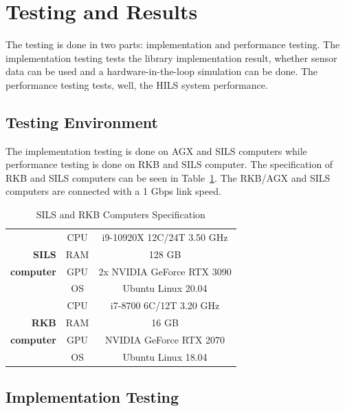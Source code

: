 \section{Testing and Results}

The testing is done in two parts: implementation and performance testing.  The
implementation testing tests the library implementation result, whether sensor
data can be used and a hardware-in-the-loop simulation can be done. The
performance testing tests, well, the HILS system performance.

\subsection{Testing Environment}

The implementation testing is done on AGX and SILS computers while performance
testing is done on RKB and SILS computer. The specification of RKB and SILS
computers can be seen in Table~\ref{tbl-section-6-computers-specs}. The RKB/AGX
and SILS computers are connected with a 1 Gbps link speed.

\begin{table}[htbp]
	\caption{SILS and RKB Computers Specification}
	\label{tbl-section-6-computers-specs}
	\begin{center}
		\begin{tabular}{r c c}
			\toprule
			                  & CPU & i9-10920X 12C/24T 3.50 GHz \\
			\textbf{SILS}     & RAM & 128 GB                     \\
			\textbf{computer} & GPU & 2x NVIDIA GeForce RTX 3090 \\
			                  & OS  & Ubuntu Linux 20.04         \\
			\midrule
			                  & CPU & i7-8700 6C/12T 3.20 GHz    \\
			\textbf{RKB}      & RAM & 16 GB                      \\
			\textbf{computer} & GPU & NVIDIA GeForce RTX 2070    \\
			                  & OS  & Ubuntu Linux 18.04         \\
			\bottomrule
		\end{tabular}
	\end{center}
\end{table}

\subsection{Implementation Testing}\label{section-4-implementation-testing}

